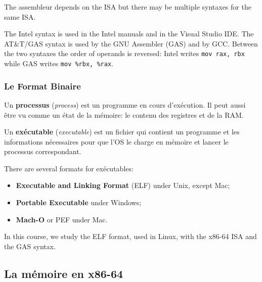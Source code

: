 The assembleur depends on the ISA but there may be multiple syntaxes for
the same ISA.
\begin{example}
  The Intel syntax is used in the Intel manuals and in the Visual Studio IDE.
  The AT\&T/GAS syntax is used by the GNU Assembler (GAS) and by GCC.
  Between the two syntaxes the order of operands is reversed: Intel writes
  \verb|mov rax, rbx| while GAS writes \verb|mov %rbx, %rax|.
\end{example}

\subsubsection{Le Format Binaire}
\begin{definition}[Processus]
  Un \textbf{processus} (\textit{process}) est un programme en cours d'exécution. Il peut
  aussi être vu comme un état de la mémoire: le contenu des registres et de la RAM.
\end{definition}
\begin{definition}[Exécutable]
  Un \textbf{exécutable} (\textit{executable}) est un fichier qui contient un
  programme et les informations nécessaires pour que l'OS le charge en mémoire
  et lancer le processus correspondant.
\end{definition}
There are several formats for exécutables:
\begin{itemize}
  \item \textbf{Executable and Linking Format} (ELF) under Unix, except Mac;
  \item \textbf{Portable Executable} under Windows;
  \item \textbf{Mach-O} or PEF under Mac.
\end{itemize}

\begin{remark}
  In this course, we study the ELF format, used in Linux, with the x86-64 ISA
  and the GAS syntax.
\end{remark}

\subsection{La mémoire en x86-64}
